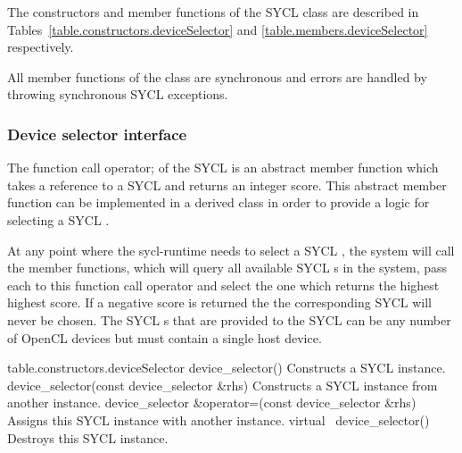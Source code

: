 The constructors and member functions of the SYCL  class are described in Tables~\ref{table.constructors.deviceSelector} and \ref{table.members.deviceSelector} respectively.

All member functions of the  class are synchronous and errors are handled by throwing synchronous SYCL exceptions.

\subsubsection{Device selector interface}

The function call operator;  of the SYCL  is an abstract member function which takes a reference to a SYCL  and returns an integer score.  This abstract member function can be implemented in a derived class in order to provide a logic for selecting a SYCL .

At any point where the \gls{sycl-runtime} needs to select a SYCL , the system will call the  member functions, which will query all available SYCL s in the system, pass each to this function call operator and select the one which returns the highest highest score. If a negative score is returned the the corresponding SYCL  will never be chosen. The SYCL s that are provided to the SYCL  can be any number of OpenCL devices but must contain a single host device.


{table.constructors.deviceSelector}
\addRow
{device_selector()}
{
  Constructs a SYCL instance.
}
\addRow
{device_selector(const device_selector \&rhs)}
{
  Constructs a SYCL  instance from another instance.
}
\addRow
{device_selector \&operator=(const device_selector \&rhs)}
{
  Assigns this SYCL  instance with another instance.
}
\addRow
{virtual ~device_selector()}
{
  Destroys this SYCL  instance.
}
\completeTable


